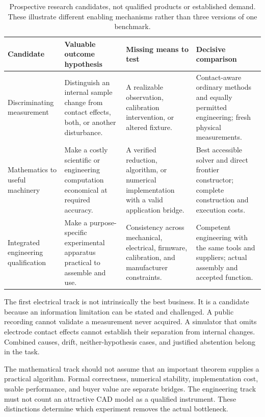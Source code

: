 \documentclass[11pt,letterpaper]{article}
\theoremstyle{remark}\newtheorem{remark}{Remark}[section]
\begin{document}
\begin{table}[H]
\caption{Prospective research candidates, not qualified products or established demand. These illustrate different enabling mechanisms rather than three versions of one benchmark.}\label{tab:candidates}
\small
\begin{tabularx}{\linewidth}{P{2.7cm}YYY}
\toprule
\textbf{Candidate}&\textbf{Valuable outcome hypothesis}&\textbf{Missing means to test}&\textbf{Decisive comparison}\\
\midrule
Discriminating measurement & Distinguish an internal sample change from contact effects, both, or another disturbance. & A realizable observation, calibration intervention, or altered fixture. & Contact-aware ordinary methods and equally permitted engineering; fresh physical measurements.\\
Mathematics to useful machinery & Make a costly scientific or engineering computation economical at required accuracy. & A verified reduction, algorithm, or numerical implementation with a valid application bridge. & Best accessible solver and direct frontier constructor; complete construction and execution costs.\\
Integrated engineering qualification & Make a purpose-specific experimental apparatus practical to assemble and use. & Consistency across mechanical, electrical, firmware, calibration, and manufacturer constraints. & Competent engineering with the same tools and suppliers; actual assembly and accepted function.\\
\bottomrule
\end{tabularx}
\end{table}

The first electrical track is not intrinsically the best business. It is a candidate because an information limitation can be stated and challenged. A public recording cannot validate a measurement never acquired. A simulator that omits electrode contact effects cannot establish their separation from internal changes. Combined causes, drift, neither-hypothesis cases, and justified abstention belong in the task.

The mathematical track should not assume that an important theorem supplies a practical algorithm. Formal correctness, numerical stability, implementation cost, usable performance, and buyer value are separate bridges. The engineering track must not count an attractive CAD model as a qualified instrument. These distinctions determine which experiment removes the actual bottleneck.
\end{document}
